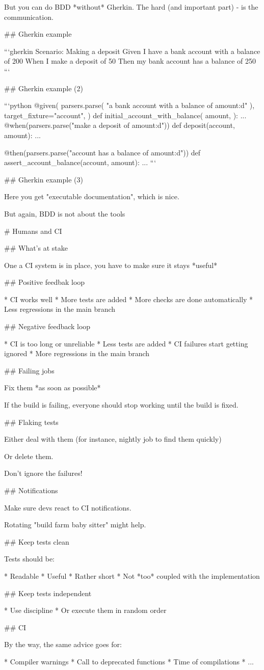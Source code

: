 But you can do BDD *without* Gherkin. The hard (and important part) - is
the communication.

## Gherkin example

```gherkin
Scenario: Making a deposit
  Given I have a bank account with a balance of 200
  When I make a deposit of 50
  Then my bank account has a balance of 250
```

## Gherkin example (2)

\small

```python
@given(
    parsers.parse(
      "a bank account with a balance of {amount:d}"
    ),
    target_fixture="account",
)
def initial_account_with_balance(
    amount,
):
    ...
@when(parsers.parse("make a deposit of {amount:d}"))
def deposit(account, amount):
    ...

@then(parsers.parse("account has a balance of {amount:d}"))
def assert_account_balance(account, amount):
    ...
```

## Gherkin example (3)

Here you get "executable documentation", which is nice.

\vfill

But again, BDD is not about the tools

# Humans and CI

## What's at stake

One a CI system is in place, you have to make sure
it stays *useful*

## Positive feedbak loop

* CI works well
* More tests are added
* More checks are done automatically
* Less regressions in the main branch

## Negative feedback loop

* CI is too long or unreliable
* Less tests are added
* CI failures start getting ignored
* More regressions in the main branch

## Failing jobs

Fix them *as soon as possible*

If the build is failing, everyone should stop working
until the build is fixed.

## Flaking tests

Either deal with them (for instance, nightly job
to find them quickly)

Or delete them.

Don't ignore the failures!

## Notifications

Make sure devs react to CI notifications.

Rotating "build farm baby sitter" might help.

## Keep tests clean

Tests should be:

* Readable
* Useful
* Rather short
* Not *too* coupled with the implementation

## Keep tests independent

* Use discipline
* Or execute them in random order

## CI

By the way, the same advice goes for:

* Compiler warnings
* Call to deprecated functions
* Time of compilations
* ...

